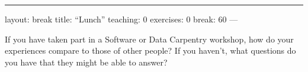 \begin{center}
\rule{3in}{0.4pt}
\end{center}
layout: break
title: ``Lunch''
teaching: 0
exercises: 0
break: 60
---

If you have taken part in a Software or Data Carpentry workshop,
how do your experiences compare to those of other people?
If you haven't,
what questions do you have that they might be able to answer?

